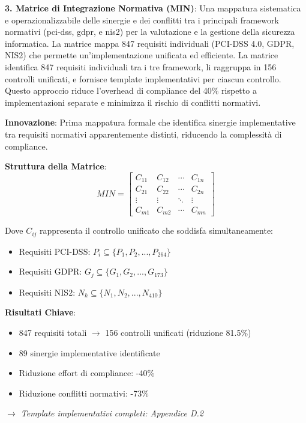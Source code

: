 \textbf{3. Matrice di Integrazione Normativa (MIN)}: Una mappatura sistematica e operazionalizzabile delle sinergie e dei conflitti tra i principali framework normativi (\gls{pci-dss}, \gls{gdpr}, e \gls{nis2}) per la valutazione e la gestione della sicurezza informatica. La matrice mappa 847 requisiti individuali (PCI-DSS 4.0, GDPR, NIS2) che permette un'implementazione unificata ed efficiente. La matrice identifica 847 requisiti individuali tra i tre framework, li raggruppa in 156 controlli unificati, e fornisce template implementativi per ciascun controllo. Questo approccio riduce l'overhead di compliance del 40\% rispetto a implementazioni separate e minimizza il rischio di conflitti normativi.

\begin{tcolorbox}[
    colback=orange!5!white,
    colframe=orange!75!black,
    title={\textbf{Innovation Box 1.3:} Matrice di Integrazione Normativa (MIN)},
    fonttitle=\bfseries,
    boxrule=1.5pt,
    arc=2mm,
    breakable
]
\textbf{Innovazione}: Prima mappatura formale che identifica sinergie implementative tra requisiti normativi apparentemente distinti, riducendo la complessità di compliance.

\vspace{0.3cm}
\textbf{Struttura della Matrice}:
\begin{equation*}
MIN = \begin{bmatrix}
C_{11} & C_{12} & \cdots & C_{1n} \\
C_{21} & C_{22} & \cdots & C_{2n} \\
\vdots & \vdots & \ddots & \vdots \\
C_{m1} & C_{m2} & \cdots & C_{mn}
\end{bmatrix}
\end{equation*}

Dove $C_{ij}$ rappresenta il controllo unificato che soddisfa simultaneamente:
\begin{itemize}
    \item Requisiti PCI-DSS: $P_i \subseteq \{P_1, P_2, ..., P_{264}\}$
    \item Requisiti GDPR: $G_j \subseteq \{G_1, G_2, ..., G_{173}\}$
    \item Requisiti NIS2: $N_k \subseteq \{N_1, N_2, ..., N_{410}\}$
\end{itemize}

\vspace{0.3cm}
\textbf{Risultati Chiave}:
\begin{itemize}
    \item 847 requisiti totali $\rightarrow$ 156 controlli unificati (riduzione 81.5\%)
    \item 89 sinergie implementative identificate
    \item Riduzione effort di compliance: -40\%
    \item Riduzione conflitti normativi: -73\%
\end{itemize}

\vspace{0.2cm}
\textit{$\rightarrow$ Template implementativi completi: Appendice D.2}
\end{tcolorbox}

